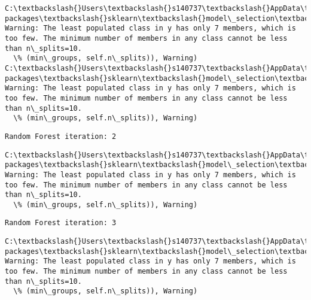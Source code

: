 \documentclass[11pt]{article}
\begin{document}
    \begin{Verbatim}[commandchars=\\\{\}]
C:\textbackslash{}Users\textbackslash{}s140737\textbackslash{}AppData\textbackslash{}Local\textbackslash{}Continuum\textbackslash{}anaconda3\textbackslash{}lib\textbackslash{}site-packages\textbackslash{}sklearn\textbackslash{}model\_selection\textbackslash{}\_split.py:605: Warning: The least populated class in y has only 7 members, which is too few. The minimum number of members in any class cannot be less than n\_splits=10.
  \% (min\_groups, self.n\_splits)), Warning)
C:\textbackslash{}Users\textbackslash{}s140737\textbackslash{}AppData\textbackslash{}Local\textbackslash{}Continuum\textbackslash{}anaconda3\textbackslash{}lib\textbackslash{}site-packages\textbackslash{}sklearn\textbackslash{}model\_selection\textbackslash{}\_split.py:605: Warning: The least populated class in y has only 7 members, which is too few. The minimum number of members in any class cannot be less than n\_splits=10.
  \% (min\_groups, self.n\_splits)), Warning)

    \end{Verbatim}

    \begin{Verbatim}[commandchars=\\\{\}]
Random Forest iteration: 2 

    \end{Verbatim}

    \begin{Verbatim}[commandchars=\\\{\}]
C:\textbackslash{}Users\textbackslash{}s140737\textbackslash{}AppData\textbackslash{}Local\textbackslash{}Continuum\textbackslash{}anaconda3\textbackslash{}lib\textbackslash{}site-packages\textbackslash{}sklearn\textbackslash{}model\_selection\textbackslash{}\_split.py:605: Warning: The least populated class in y has only 7 members, which is too few. The minimum number of members in any class cannot be less than n\_splits=10.
  \% (min\_groups, self.n\_splits)), Warning)

    \end{Verbatim}

    \begin{Verbatim}[commandchars=\\\{\}]
Random Forest iteration: 3 

    \end{Verbatim}

    \begin{Verbatim}[commandchars=\\\{\}]
C:\textbackslash{}Users\textbackslash{}s140737\textbackslash{}AppData\textbackslash{}Local\textbackslash{}Continuum\textbackslash{}anaconda3\textbackslash{}lib\textbackslash{}site-packages\textbackslash{}sklearn\textbackslash{}model\_selection\textbackslash{}\_split.py:605: Warning: The least populated class in y has only 7 members, which is too few. The minimum number of members in any class cannot be less than n\_splits=10.
  \% (min\_groups, self.n\_splits)), Warning)

    \end{Verbatim}
\end{document}
